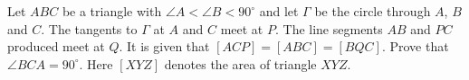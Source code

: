 Let $ABC$ be a triangle with $\angle A < \angle B < 90^\circ$ and let $\Gamma$ be the circle through $A$, $B$ and $C$. The tangents to $\Gamma$ at $A$ and $C$ meet at $P$. The line segments $AB$ and $PC$ produced meet at $Q$. It is given that $[ACP] = [ABC] = [BQC]$. Prove that $\angle BCA = 90^\circ$. Here $[XYZ]$ denotes the area of triangle $XYZ$.
